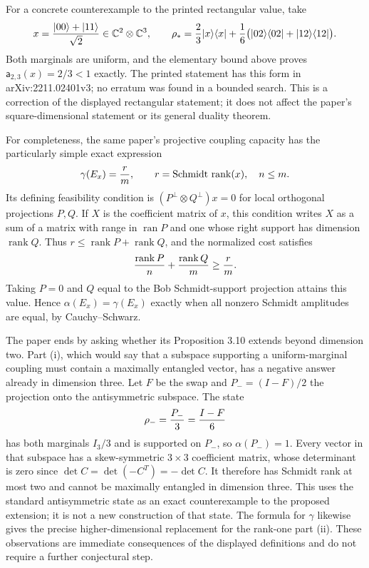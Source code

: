 For a concrete counterexample to the printed rectangular value, take
\[
 x={|00\rangle+|11\rangle\over\sqrt2}\in\mathbb C^2\otimes\mathbb C^3,
 \qquad
 \rho_*={2\over3}|x\rangle\langle x|
       +{1\over6}\bigl(|02\rangle\langle02|+|12\rangle\langle12|\bigr).
\]
Both marginals are uniform, and the elementary bound above proves
$\mathsf a_{2,3}(x)=2/3<1$ exactly. The printed statement has this form in arXiv:2211.02401v3; no erratum was found in a bounded search. This is a correction of the displayed rectangular
statement; it does not affect the paper's square-dimensional statement
or its general duality theorem.

For completeness, the same paper's projective coupling capacity has the
particularly simple exact expression
\[
 \gamma(E_x)={r\over m},\qquad r=\operatorname{Schmidt\ rank}(x),\quad n\le m.
\]
Its defining feasibility condition is
$(P^\perp\otimes Q^\perp)x=0$ for local orthogonal projections $P,Q$.
If $X$ is the coefficient matrix of $x$, this condition writes $X$ as a
sum of a matrix with range in $\operatorname{ran}P$ and one whose right
support has dimension $\operatorname{rank}Q$. Thus
$r\le\operatorname{rank}P+\operatorname{rank}Q$, and the normalized cost
satisfies
\[
 {\operatorname{rank}P\over n}+{\operatorname{rank}Q\over m}
 \ge {r\over m}.
\]
Taking $P=0$ and $Q$ equal to the Bob Schmidt-support projection attains
this value. Hence $\alpha(E_x)=\gamma(E_x)$ exactly when all nonzero
Schmidt amplitudes are equal, by Cauchy--Schwarz.

The paper ends by asking whether its Proposition 3.10 extends beyond
dimension two. Part (i), which would say that a subspace supporting a
uniform-marginal coupling must contain a maximally entangled vector, has
a negative answer already in dimension three. Let $F$ be the swap and
$P_-=(I-F)/2$ the projection onto the antisymmetric subspace. The state
\[
 \rho_-={P_-\over3}={I-F\over6}
\]
has both marginals $I_3/3$ and is supported on $P_-$, so
$\alpha(P_-)=1$. Every vector in that subspace has a skew-symmetric
$3\times3$ coefficient matrix, whose determinant is zero since
$\det C=\det(-C^T)=-\det C$. It therefore has Schmidt rank at most two
and cannot be maximally entangled in dimension three. This uses the
standard antisymmetric state as an exact counterexample to the proposed
extension; it is not a new construction of that state. The formula for
$\gamma$ likewise gives the precise higher-dimensional replacement for
the rank-one part (ii). These observations are immediate consequences of
the displayed definitions and do not require a further conjectural step.

